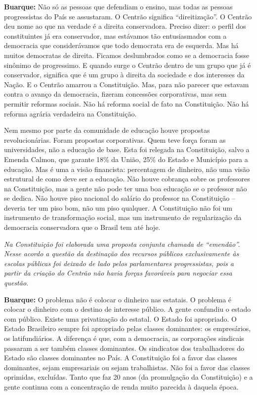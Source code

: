 \textbf{Buarque:} Não só as pessoas que defendiam o ensino, mas todas as
pessoas progressistas do País se assustaram. O Centrão significa
``direitização''. O Centrão deu nome ao que na verdade é a direita
conservadora. Preciso dizer: o perfil dos constituintes já era
conservador, mas estávamos tão entusiasmados com a democracia que
considerávamos que todo democrata era de esquerda. Mas há muitos
democratas de direita. Ficamos deslumbrados como se a democracia fosse
sinônimo de progressimo. E quando surge o Centrão dentro de um grupo que
já é conservador, significa que é um grupo à direita da sociedade e dos
interesses da Nação. E o Centrão amarrou a Constituição. Mas, para não
parecer que estavam contra o avanço da democracia, fizeram concessões
corporativas, mas sem permitir reformas sociais. Não há reforma social
de fato na Constituição. Não há reforma agrária verdadeira na
Constituição.

Nem mesmo por parte da comunidade de educação houve propostas
revolucionárias. Foram propostas corporativas. Quem teve força foram as
universidades, não a educação de base. Esta foi relegada na
Constituição, salvo a Emenda Calmon, que garante 18\% da União, 25\% do
Estado e Município para a educação. Mas é uma a visão financista:
percentagem de dinheiro, não uma visão estrutural de como deve ser a
educação. Não houve cobrança sobre os professores na Constituição, mas a
gente não pode ter uma boa educação se o professor não se dedica. Não
houve piso nacional do salário do professor na Constituição -- deveria
ter um piso bom, não um piso qualquer. A Constituição não foi um
instrumento de transformação social, mas um instrumento de regularização
da democracia conservadora que o Brasil tem até hoje.

\emph{Na Constituição foi elaborada uma proposta conjunta chamada de
``emendão''. Nesse acordo a questão da destinação dos recursos públicos
exclusivamente às escolas públicas foi deixado de lado pelos
parlamentares progressistas, pois a partir da criação do Centrão não
havia forças favoráveis para negociar essa questão.}

\textbf{Buarque:} O problema não é colocar o dinheiro nas estatais. O
problema é colocar o dinheiro com o destino de interesse público. A
gente confundiu o estado com público. Existe uma privatização do
estatal. O Estado foi apropriado. O Estado Brasileiro sempre foi
apropriado pelas classes dominantes: os empresários, os latifundiários.
A diferença é que, com a democracia, as corporações sindicais passaram a
ser também classes dominantes. Os sindicatos dos trabalhadores do Estado
são classes dominantes no País. A Constituição foi a favor das classes
dominantes, sejam empresariais ou sejam trabalhistas. Não foi a favor
das classes oprimidas, excluídas. Tanto que faz 20 anos (da promulgação
da Constituição) e a gente continua com a concentração de renda muito
parecida à daquela época.

